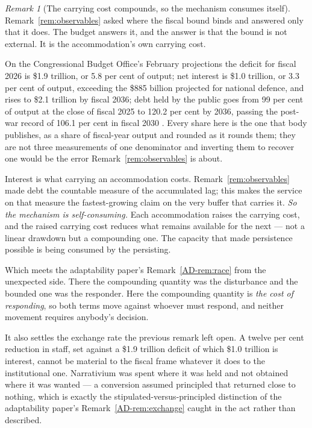 \documentclass[11pt,a4paper]{article}
\theoremstyle{remark}
\newtheorem{remark}[definition]{Remark}
\begin{document}
\begin{remark}[The carrying cost compounds, so the mechanism consumes itself]\label{rem:carry}
Remark~\ref{rem:observables} asked where the fiscal bound binds and answered only that it does. The
budget answers it, and the answer is that the bound is not external. It is the accommodation's own
carrying cost.

On the Congressional Budget Office's February projections the deficit for fiscal 2026 is \$1.9 trillion,
or 5.8 per cent of output; net interest is \$1.0 trillion, or 3.3 per cent of output, exceeding the \$885
billion projected for national defence, and rises to \$2.1 trillion by fiscal 2036; debt held by the
public goes from 99 per cent of output at the close of fiscal 2025 to 120.2 per cent by 2036, passing the
post-war record of 106.1 per cent in fiscal 2030 \citep{cbo2026}. Every share here is the one that body
publishes, as a share of fiscal-year output and rounded as it rounds them; they are not three
measurements of one denominator and inverting them to recover one would be the error
Remark~\ref{rem:observables} is about.

Interest is what carrying an accommodation costs. Remark~\ref{rem:observables} made debt the
countable measure of the accumulated lag; this makes the service on that measure the fastest-growing
claim on the very buffer that carries it. \emph{So the mechanism is self-consuming.} Each accommodation
raises the carrying cost, and the raised carrying cost reduces what remains available for the next ---
not a linear drawdown but a compounding one. The capacity that made persistence possible is being
consumed by the persisting.

Which meets the adaptability paper's Remark~\ref{AD-rem:race} from the unexpected side. There the compounding quantity was the
disturbance and the bounded one was the responder. Here the compounding quantity is \emph{the cost of
responding}, so both terms move against whoever must respond, and neither movement requires anybody's
decision.

It also settles the exchange rate the previous remark left open. A twelve per cent reduction in
staff, set against a \$1.9 trillion deficit of which \$1.0 trillion is interest, cannot be material to
the fiscal frame whatever it does to the institutional one. Narrativium was spent where it was
held and not obtained where it was wanted --- a conversion assumed principled that returned close to
nothing, which is exactly the stipulated-versus-principled distinction of the adaptability paper's Remark~\ref{AD-rem:exchange}
caught in the act rather than described.


\end{remark}
\end{document}
